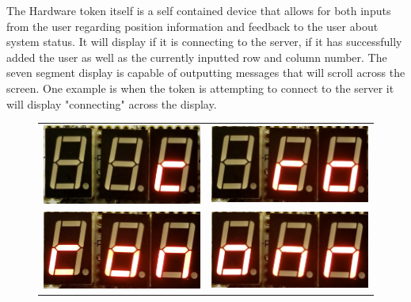 \documentclass[a4paper,10pt]{article}
\begin{document}
The Hardware token itself is a self contained device that allows for both inputs from the user regarding position information and feedback to the user about system status. It will display if it is connecting to the server, if it has successfully added the user as well as the currently inputted row and column number. The seven segment display is capable of outputting messages that will scroll across the screen. One example is when the token is attempting to connect to the server it will display "connecting" across the display.



\pagebreak
\begin{figure}[H]

  \centering

  \begin{tabular}{cc}


    \includegraphics[width=60mm]{Assets/c.png}&

    \includegraphics[width=60mm]{Assets/co.png}\\

    \includegraphics[width=60mm]{Assets/conn.png}&

    \includegraphics[width=60mm]{Assets/onn.png}\\


\end{tabular}
\end{figure}
\end{document}

